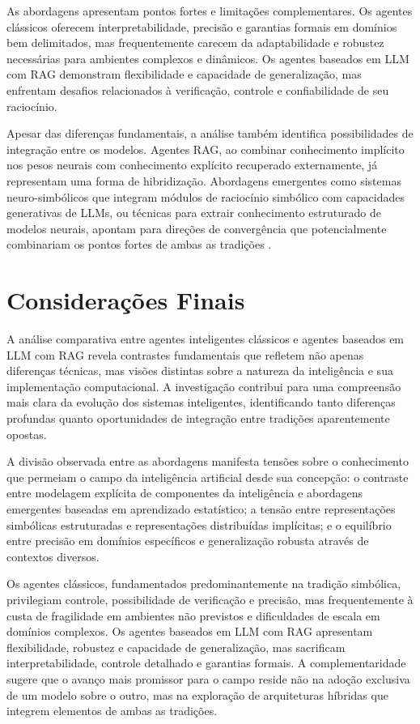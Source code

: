 \documentclass[12pt]{article}
\begin{document}
As abordagens apresentam pontos fortes e limitações complementares. Os agentes clássicos oferecem interpretabilidade, precisão e garantias formais em domínios bem delimitados, mas frequentemente carecem da adaptabilidade e robustez necessárias para ambientes complexos e dinâmicos. Os agentes baseados em LLM com RAG demonstram flexibilidade e capacidade de generalização, mas enfrentam desafios relacionados à verificação, controle e confiabilidade de seu raciocínio.

Apesar das diferenças fundamentais, a análise também identifica possibilidades de integração entre os modelos. Agentes RAG, ao combinar conhecimento implícito nos pesos neurais com conhecimento explícito recuperado externamente, já representam uma forma de hibridização. Abordagens emergentes como sistemas neuro-simbólicos que integram módulos de raciocínio simbólico com capacidades generativas de LLMs, ou técnicas para extrair conhecimento estruturado de modelos neurais, apontam para direções de convergência que potencialmente combinariam os pontos fortes de ambas as tradições \citep{garcez2020neurosymbolic}.

\section{Considerações Finais}

A análise comparativa entre agentes inteligentes clássicos e agentes baseados em LLM com RAG revela contrastes fundamentais que refletem não apenas diferenças técnicas, mas visões distintas sobre a natureza da inteligência e sua implementação computacional. A investigação contribui para uma compreensão mais clara da evolução dos sistemas inteligentes, identificando tanto diferenças profundas quanto oportunidades de integração entre tradições aparentemente opostas.

A divisão observada entre as abordagens manifesta tensões sobre o conhecimento que permeiam o campo da inteligência artificial desde sua concepção: o contraste entre modelagem explícita de componentes da inteligência e abordagens emergentes baseadas em aprendizado estatístico; a tensão entre representações simbólicas estruturadas e representações distribuídas implícitas; e o equilíbrio entre precisão em domínios específicos e generalização robusta através de contextos diversos.

Os agentes clássicos, fundamentados predominantemente na tradição simbólica, privilegiam controle, possibilidade de verificação e precisão, mas frequentemente à custa de fragilidade em ambientes não previstos e dificuldades de escala em domínios complexos. Os agentes baseados em LLM com RAG apresentam flexibilidade, robustez e capacidade de generalização, mas sacrificam interpretabilidade, controle detalhado e garantias formais. A complementaridade sugere que o avanço mais promissor para o campo reside não na adoção exclusiva de um modelo sobre o outro, mas na exploração de arquiteturas híbridas que integrem elementos de ambas as tradições.
\end{document}
